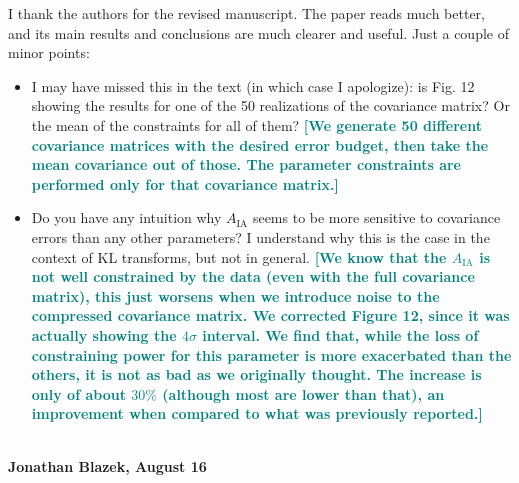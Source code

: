 \documentclass{article}
\newcommand\reply[1]{{\bf {\textcolor{teal}{[#1]}}}}
\begin{document}
	I thank the authors for the revised manuscript. The paper reads much better, and its main results and conclusions are much clearer and useful. Just a couple of minor points:
	\begin{itemize}
		\item I may have missed this in the text (in which case I apologize): is Fig. 12 showing the results for one of the 50 realizations of the covariance matrix? Or the mean of the constraints for all of them? \reply{We generate 50 different covariance matrices with the desired error budget, then take the mean covariance out of those. The parameter constraints are performed only for that covariance matrix.}
		\item Do you have any intuition why $A_{\mathrm{IA}}$ seems to be more sensitive to covariance errors than any other parameters? I understand why this is the case in the context of KL transforms, but not in general. \reply{We know that the $A_{\mathrm{IA}}$ is not well constrained by the data (even with the full covariance matrix), this just worsens when we introduce noise to the compressed covariance matrix. We corrected Figure 12, since it was actually showing the $4\sigma$ interval. We find that, while the loss of constraining power for this parameter is more exacerbated than the others, it is not as bad as we originally thought. The increase is only of about $30\%$ (although most are lower than that), an improvement when compared to what was previously reported.}\\  \\
	\end{itemize}
	
	
	\textbf{Jonathan Blazek, August 16} \\
	
\end{document}
